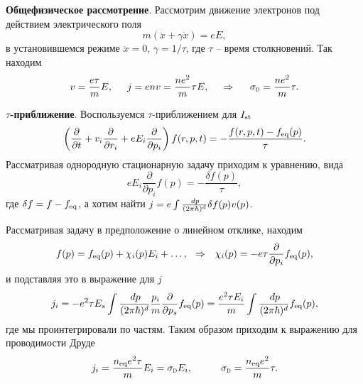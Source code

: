 

\textbf{Общефизическое рассмотрение}. 
Рассмотрим движение электронов под действием электрического поля
\begin{equation*}
	m (\ddot{x} + \gamma \dot{x}) = e E,
\end{equation*}
в установившемся режиме $\ddot{x} = 0$, $\gamma = 1/\tau$, где $\tau$ -- время столкновений. Так находим
\begin{equation*}
	v = \frac{e \tau}{m}E,
	\hspace{5 mm} 
	j = e n v = \frac{n e^2}{m} \tau E,
	\hspace{0.5cm} \Rightarrow \hspace{0.5cm}
	\sigD = \frac{n e^2}{m} \tau.
\end{equation*}

\textbf{$\tau$-приближение}. Воспользуемся $\tau$-приближением для $I_{\textnormal{st}}$
\begin{equation*}
	\left(
		\frac{\partial }{\partial t} + v_i \frac{\partial }{\partial r_i} + e E_i \frac{\partial }{\partial p_i} 
	\right) f(r, p, t) = - \frac{f(r, p, t) - f_{\textnormal{eq}} (p)}{\tau}.
\end{equation*}
Рассматривая однородную стационарную задачу приходим к уравнению, вида
\begin{equation*}
	e E_i \frac{\partial }{\partial p_i} f(p) = - \frac{\delta f(p)}{\tau},
\end{equation*}
где $\delta f = f - f_{\textnormal{eq}}$, а хотим найти $j = e \int \frac{\, d p}{(2 \pi \hbar)^d} \delta f(p) v(p)$.

Рассматривая задачу в предположение о линейном отклике, находим
\begin{equation*}
	f(p) = f_{\textnormal{eq}} (p) + \chi_i (p) E_i + \ldots,
	\hspace{0.25cm} \Rightarrow \hspace{0.25cm}
	\chi_i (p) = - e \tau \frac{\partial }{\partial p_i} f_{\textnormal{eq}} (p),
\end{equation*}
и подставляя это в выражение для $j$
\begin{equation*}
	j_i = - e^2 \tau E_s \int \frac{\, d p}{(2 \pi \hbar)^d} \frac{p_i}{m} \frac{\partial }{\partial p_s} f_{\textnormal{eq}} (p) = \frac{e^2 \tau E_i}{m} \int \frac{\, d p}{(2 \pi \hbar)^d} f_{\textnormal{eq}} (p),
\end{equation*}
где мы проинтегрировали по частям. Таким образом приходим к выражению для проводимости Друде
\begin{equation*}
	 j_i = \frac{\sub{n}{eq} e^2 \tau}{m} E_i = \sigD E_i,
	 \hspace{10 mm} 
	 \sigD = \frac{\sub{n}{eq} e^2}{m} \tau.
\end{equation*}

